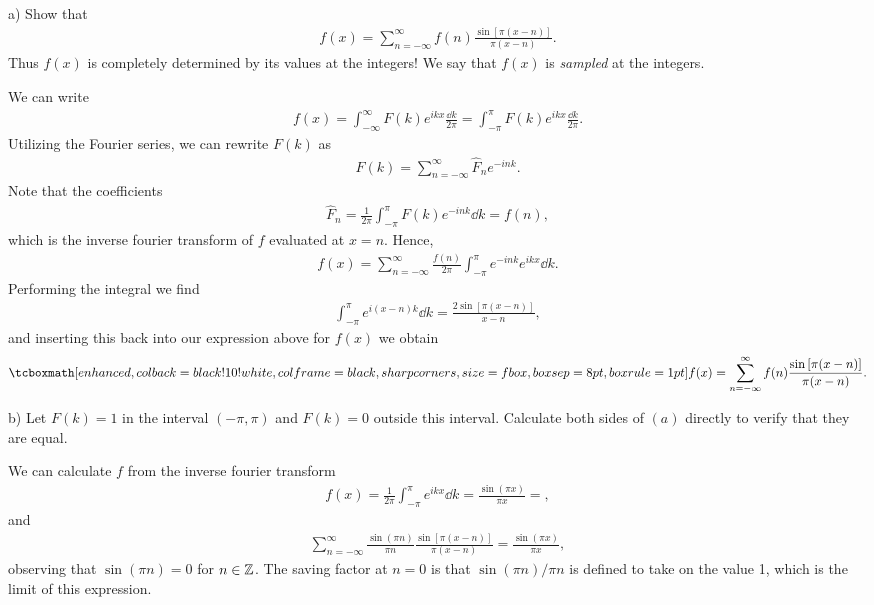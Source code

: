 a) Show that 
\begin{eqnarray}
    f(x) = \sum_{n=-\infty}^{\infty} f(n) \frac{\sin{[\pi (x-n)]}}{\pi(x-n)}
.\end{eqnarray}
Thus $f(x)$ is completely determined by its values at the integers!
We say that $f(x)$ is \textit{sampled} at the integers.

We can write
\begin{eqnarray}
    f(x) = \int_{-\infty}^{\infty} F(k) e^{ikx} \frac{\dd{k}}{2\pi} = \int_{-\pi}^{\pi} F(k) e^{ikx} \frac{\dd{k}}{2\pi}
.\end{eqnarray}
Utilizing the Fourier series, we can rewrite $F(k)$ as
\begin{eqnarray}
    F(k) = \sum_{n=-\infty}^{\infty} \hat{F}_n e^{-ink}
.\end{eqnarray}
Note that the coefficients
\begin{eqnarray}
    \hat{F}_{n} = \frac{1}{2\pi} \int_{-\pi}^{\pi} F(k) e^{-ink} \dd{k} = f(n)
,\end{eqnarray}
which is the inverse fourier transform of $f$ evaluated at $x = n$.
Hence,
\begin{eqnarray}
    f(x) = \sum_{n=-\infty}^{\infty} \frac{f(n)}{2\pi} \int_{-\pi}^{\pi} e^{-ink} e^{ikx} \dd{k}
.\end{eqnarray}
Performing the integral we find
\begin{eqnarray}
    \int_{-\pi}^{\pi} e^{i(x-n)k} \dd{k} = \frac{2 \sin{[\pi(x-n)]}}{x-n}
,\end{eqnarray}
and inserting this back into our expression above for $f(x)$ we obtain
\begin{eqnarray}
    \eqbox{
    f(x) = \sum_{n=-\infty}^{\infty} f(n) \frac{\sin{[\pi(x-n)]}}{\pi(x-n)}
}
.\end{eqnarray}


b) Let $F(k) = 1$ in the interval $(-\pi,\pi)$ and $F(k) = 0$ outside this interval.
Calculate both sides of $(a)$ directly to verify that they are equal.

We can calculate $f$ from the inverse fourier transform
\begin{eqnarray}
    f(x) = \frac{1}{2\pi}\int_{-\pi}^{\pi} e^{ikx} \dd{k} = \frac{\sin{(\pi x)}}{\pi x} = 
,\end{eqnarray}
and
\begin{eqnarray}
    \sum_{n=-\infty}^{\infty} \frac{\sin{(\pi n)}}{\pi n} \frac{\sin{[\pi(x - n)]}}{\pi(x-n)} = \frac{\sin{(\pi x)}}{\pi x}
,\end{eqnarray}
observing that $\sin{(\pi n)} = 0$ for $n \in \mathbb{Z}$.
The saving factor at $n=0$ is that $\sin{(\pi n)}/\pi n$ is defined to take on the value 1, which is the limit of this expression.




